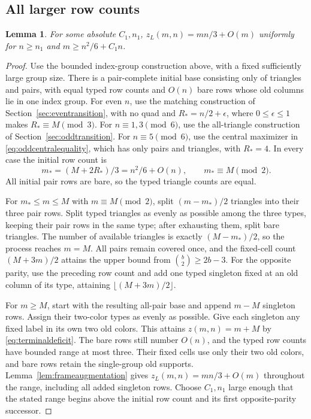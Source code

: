 \documentclass[11pt]{article}
\newtheorem{lemma}[theorem]{Lemma}
\newcommand{\zl}{z_L}
\begin{document}
\subsection{All larger row counts}\label{sec:highrows}
\begin{lemma}\label{lem:highrows}
For some absolute $C_1,n_1$,
$\zl(m,n)=mn/3+O(m)$ uniformly for $n\ge n_1$ and
$m\ge n^2/6+C_1n$.
\end{lemma}
\begin{proof}
Use the bounded index-group construction above, with a fixed sufficiently
large group size. There is a pair-complete initial base consisting only
of triangles and pairs, with equal typed row counts and $O(n)$ bare rows
whose old columns lie in one index group.
For even $n$, use the matching construction of
Section~\ref{sec:eventransition}, with no quad and
$R_*=n/2+\epsilon$, where $0\le\epsilon\le1$ makes $R_*\equiv M\pmod3$.
For $n\equiv1,3\pmod6$, use the all-triangle construction of
Section~\ref{sec:oddtransition}. For $n\equiv5\pmod6$, use the central
maximizer in \eqref{eq:oddcentralequality}, which has only pairs and
triangles, with $R_*=4$.
In every case the initial row count is
\[
 m_*=(M+2R_*)/3=n^2/6+O(n),\qquad m_*\equiv M\pmod2.
\]
All initial pair rows are bare, so the typed triangle counts are equal.

For $m_*\le m\le M$ with $m\equiv M\pmod2$, split
$(m-m_*)/2$ triangles into their three pair rows. Split typed triangles
as evenly as possible among the three types, keeping their pair rows
in the same type; after exhausting them, split bare triangles.
The number of available triangles is exactly $(M-m_*)/2$, so the process
reaches $m=M$. All pairs remain covered once, and the fixed-cell count
$(M+3m)/2$ attains the upper bound from $\binom b2\ge2b-3$.
For the opposite parity, use the preceding row count and add one typed
singleton fixed at an old column of its type, attaining
$\lfloor(M+3m)/2\rfloor$.

For $m\ge M$, start with the resulting all-pair base and append $m-M$
singleton rows. Assign their two-color types as evenly as possible.
Give each singleton any fixed label in its own two old colors.
This attains $z(m,n)=m+M$ by \eqref{eq:terminaldeficit}.
The bare rows still number $O(n)$, and the typed row counts have bounded
range at most three. Their fixed cells use only their two old colors,
and bare rows retain the single-group old supports.
Lemma~\ref{lem:frameaugmentation} gives $\zl(m,n)=mn/3+O(m)$
throughout the range, including all added singleton rows.
Choose $C_1,n_1$ large enough that the stated range begins above the
initial row count and its first opposite-parity successor.
\end{proof}
\end{document}
